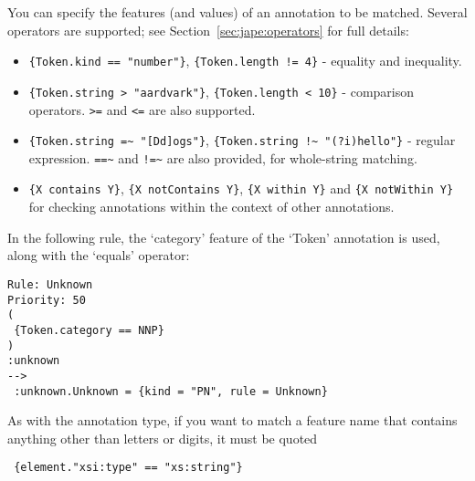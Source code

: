 
You can specify the features (and values) of an annotation to be matched.
Several operators are supported; see Section~\ref{sec:jape:operators} for full
details:
  \begin{itemize}
  \item \verb|{Token.kind == "number"}|, \verb|{Token.length != 4}| - equality
  and inequality.
  \item \verb|{Token.string > "aardvark"}|, \verb|{Token.length < 10}| -
  comparison operators. \verb|>=| and \verb|<=| are also supported.
  \item \verb|{Token.string =~ "[Dd]ogs"}|,
  \verb|{Token.string !~ "(?i)hello"}| - regular expression.  \verb|==~| and
  \verb|!=~| are also provided, for whole-string matching.
  \item \verb|{X contains Y}|, \verb|{X notContains Y}|, \verb|{X within Y}|
  and \verb|{X notWithin Y}| for checking annotations within the context of
  other annotations.
  \end{itemize}

In the following rule, the `category' feature of the `Token' annotation is
used, along with the `equals' operator:

\begin{small}
\begin{verbatim}
Rule: Unknown
Priority: 50
( 
 {Token.category == NNP}
) 
:unknown
-->
 :unknown.Unknown = {kind = "PN", rule = Unknown}
\end{verbatim}
\end{small}

As with the annotation type, if you want to match a feature name that contains
anything other than letters or digits, it must be quoted

\begin{small}
\begin{verbatim}
 {element."xsi:type" == "xs:string"}
\end{verbatim}
\end{small}


